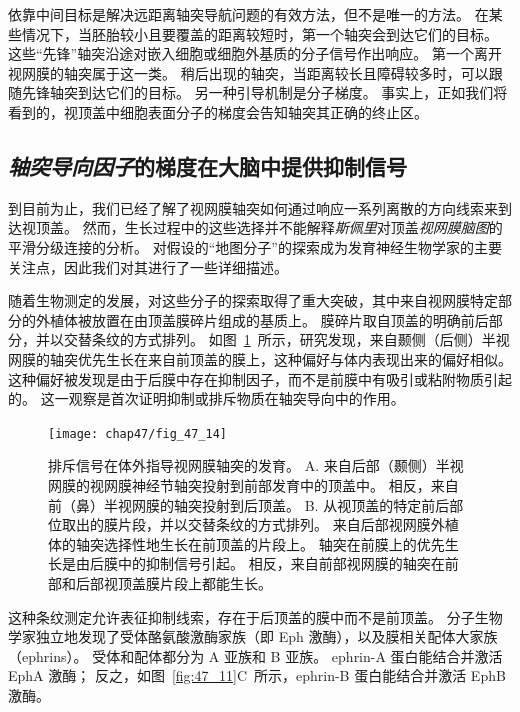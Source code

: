 依靠中间目标是解决远距离轴突导航问题的有效方法，但不是唯一的方法。
在某些情况下，当胚胎较小且要覆盖的距离较短时，第一个轴突会到达它们的目标。
这些“先锋”轴突沿途对嵌入细胞或细胞外基质的分子信号作出响应。
第一个离开视网膜的轴突属于这一类。
稍后出现的轴突，当距离较长且障碍较多时，可以跟随先锋轴突到达它们的目标。
另一种引导机制是分子梯度。
事实上，正如我们将看到的，视顶盖中细胞表面分子的梯度会告知轴突其正确的终止区。



\subsection{\textit{轴突导向因子}的梯度在大脑中提供抑制信号}

到目前为止，我们已经了解了视网膜轴突如何通过响应一系列离散的方向线索来到达视顶盖。
然而，生长过程中的这些选择并不能解释\textit{斯佩里}对顶盖\textit{视网膜脑图}的平滑分级连接的分析。
对假设的“地图分子”的探索成为发育神经生物学家的主要关注点，因此我们对其进行了一些详细描述。


随着生物测定的发展，对这些分子的探索取得了重大突破，其中来自视网膜特定部分的外植体被放置在由顶盖膜碎片组成的基质上。
膜碎片取自顶盖的明确前后部分，并以交替条纹的方式排列。 
如图~\ref{fig:47_14}~所示，研究发现，来自颞侧（后侧）半视网膜的轴突优先生长在来自前顶盖的膜上，这种偏好与体内表现出来的偏好相似。
这种偏好被发现是由于后膜中存在抑制因子，而不是前膜中有吸引或粘附物质引起的。
这一观察是首次证明抑制或排斥物质在轴突导向中的作用。


\begin{figure}[htbp]
	\centering
	\texttt{[image: chap47/fig\_47\_14]}
	\caption{排斥信号在体外指导视网膜轴突的发育。
		A. 来自后部（颞侧）半视网膜的视网膜神经节轴突投射到前部发育中的顶盖中。
		相反，来自前（鼻）半视网膜的轴突投射到后顶盖。
		B. 从视顶盖的特定前后部位取出的膜片段，并以交替条纹的方式排列。
		来自后部视网膜外植体的轴突选择性地生长在前顶盖的片段上。
		轴突在前膜上的优先生长是由后膜中的抑制信号引起。
		相反，来自前部视网膜的轴突在前部和后部视顶盖膜片段上都能生长\cite{walter1987avoidance}。}
	\label{fig:47_14}
\end{figure}


这种条纹测定允许表征抑制线索，存在于后顶盖的膜中而不是前顶盖。
分子生物学家独立地发现了受体酪氨酸激酶家族（即 Eph 激酶），以及膜相关配体大家族（ephrins）。
受体和配体都分为 A 亚族和 B 亚族。
ephrin-A 蛋白能结合并激活 EphA 激酶；
反之，如图~\ref{fig:47_11}C~所示，ephrin-B 蛋白能结合并激活 EphB 激酶。


